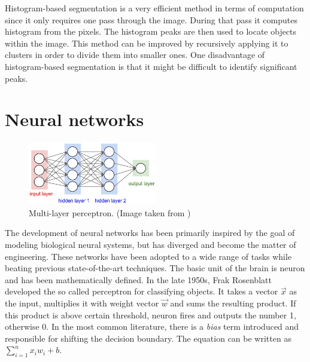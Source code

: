 Histogram-based segmentation is a very efficient method in terms of computation since
it only requires one pass through the image. During that pass it computes histogram
from the pixels. The histogram peaks are then used to locate objects within the image.
This method can be improved by recursively applying it to clusters in order to divide
them into smaller ones. One disadvantage of histogram-based segmentation is that
it might be difficult to identify significant peaks.

\section{Neural networks}
\label{sec:nn}

\begin{figure}[!h]
	\centerline{\includegraphics[width=0.5\textwidth]{images/neural_net.jpeg}}
	\caption[Multi-layer perceptron]{Multi-layer perceptron. (Image taken from \cite{bib:cnncs231n})}
	\label{img:neural_net}
\end{figure}

The development of neural networks has been primarily inspired by the goal of
modeling biological neural systems, but has diverged and become the matter of engineering.
These networks have been adopted to a wide range of tasks while beating previous
state-of-the-art techniques. The basic unit of the brain is neuron and has been
mathematically defined. In the late 1950s, Frak Rosenblatt developed the so called perceptron
for classifying objects. It takes a vector $\Vec{x}$ as the input, multiplies it
with weight vector $\Vec{w}$ and sums the resulting product. If this product is
above certain threshold, neuron fires and outputs the number 1, otherwise 0.
In the most common literature, there is a \textit{bias} term introduced and
responsible for shifting the decision boundary. The equation can be written
as $\sum_{i=1}^n x_iw_i + b$.

